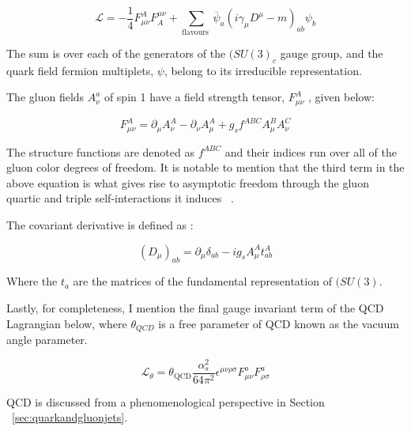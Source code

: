 \begin{equation}
\mathcal{L}=-\frac{1}{4} F_{\mu \nu}^{A} F_{A}^{\mu \nu}+\sum_{\text {flavours }} \overline{\psi}_{a}\left(i \gamma_{\mu} D^{\mu}-m\right)_{a b} \psi_{b}
\end{equation}


The sum is over each of the generators of the $(SU(3)_c$ gauge group, and the quark field fermion multiplets, $\psi$, belong to its irreducible representation.~\cite{Crewther:1995wq}

The gluon fields $A_{\nu}^a$ of spin 1 have a field strength tensor, $F_{\mu \nu}^{A}$ , given below:\newline 

\begin{equation}
F_{\mu \nu}^{A}=\partial_{\mu} A_{\nu}^{A}-\partial_{\nu} A_{\mu}^{A}+g_{s} f^{A B C} A_{\mu}^{B} A_{\nu}^{C}
\end{equation}


The structure functions are denoted as $f^{A B C}$ and their indices run over all of the gluon color degrees of freedom. It is notable to mention that the third term in the above equation is what gives rise to asymptotic freedom through the gluon quartic and triple self-interactions it induces ~\cite{Crewther:1995wq}.

The covariant derivative is defined as :\newline

\begin{equation}
\left(D_{\mu}\right)_{a b}=\partial_{\mu} \delta_{a b}-i g_{s} A_{\mu}^{A} t_{a b}^{A}
\end{equation}

Where the $t_{a}$ are the matrices of the fundamental representation of $(SU(3)$.

Lastly, for completeness, I mention the final gauge invariant term of the QCD Lagrangian below, where $\theta_{QCD}$ is a free parameter of QCD known as the vacuum angle parameter.

\begin{equation}
\mathcal{L}_{\theta}=\theta_{\mathrm{QCD}} \frac{\alpha_{s}^{2}}{64 \pi^{2}} \epsilon^{\mu \nu \rho \sigma} F_{\mu \nu}^{a} F_{\rho \sigma}^{a}
\end{equation}


QCD is discussed from a phenomenological perspective in Section ~\ref{sec:quarkandgluonjets}. 













